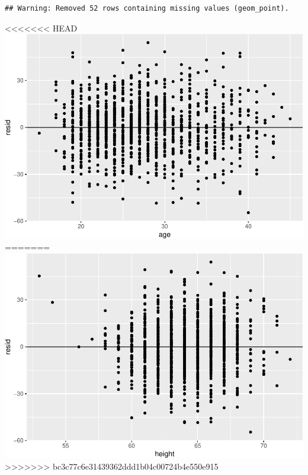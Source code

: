 \documentclass[]{article}
\newenvironment{Shaded}{\begin{snugshade}}{\end{snugshade}}
\newcommand{\DataTypeTok}[1]{\textcolor[rgb]{0.13,0.29,0.53}{#1}}
\newcommand{\DecValTok}[1]{\textcolor[rgb]{0.00,0.00,0.81}{#1}}
\newcommand{\KeywordTok}[1]{\textcolor[rgb]{0.13,0.29,0.53}{\textbf{#1}}}
\newcommand{\NormalTok}[1]{#1}
\newcommand{\OperatorTok}[1]{\textcolor[rgb]{0.81,0.36,0.00}{\textbf{#1}}}
\newcommand{\StringTok}[1]{\textcolor[rgb]{0.31,0.60,0.02}{#1}}
\begin{document}
\begin{verbatim}
## Warning: Removed 52 rows containing missing values (geom_point).
\end{verbatim}

<<<<<<< HEAD
\includegraphics{lab-8-regression_files/figure-latex/unnamed-chunk-20-1.pdf}
=======
\includegraphics{lab-8-regression_files/figure-latex/unnamed-chunk-21-1.pdf}
>>>>>>> bc3c77c6e31439362ddd1b04c00724b4e550e915

\begin{Shaded}
\end{Shaded}
\end{document}
